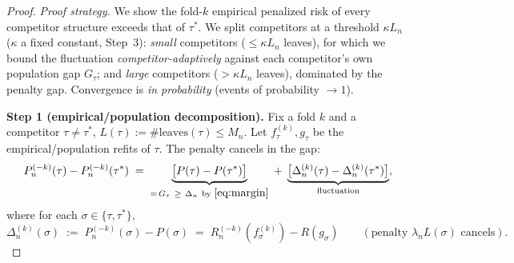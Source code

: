 \begin{proof}
\emph{Proof strategy.} We show the fold-$k$ empirical penalized risk of every
competitor structure exceeds that of $\tau^\ast$. We split competitors at a
threshold $\kappa L_n$ ($\kappa$ a fixed constant, Step~3): \emph{small}
competitors ($\le\kappa L_n$ leaves), for which we bound the fluctuation
\emph{competitor-adaptively} against each competitor's own population gap
$G_\tau$; and \emph{large} competitors ($>\kappa L_n$ leaves), dominated by the
penalty gap. Convergence is \emph{in probability} (events of probability $\to1$).

\smallskip\noindent\textbf{Step 1 (empirical/population decomposition).}
Fix a fold $k$ and a competitor $\tau\neq\tau^\ast$, $L(\tau):=\#\mathrm{leaves}(\tau)
\le M_n$. Let $f_\tau^{(k)},g_\tau$ be the empirical/population refits of $\tau$.
The penalty cancels in the gap:
\begin{equation}\label{eq:gap-decomp}
  P_n^{(-k)}(\tau) - P_n^{(-k)}(\tau^\ast)
  \;=\; \underbrace{\bigl[P(\tau)-P(\tau^\ast)\bigr]}_{=\,G_\tau\ \ge\ \Delta_n\ \text{by }
        \eqref{eq:margin}}
     \;+\; \underbrace{\bigl[\Delta_n^{(k)}(\tau)-\Delta_n^{(k)}(\tau^\ast)\bigr]}_{
        \text{fluctuation}},
\end{equation}
where for each $\sigma\in\{\tau,\tau^\ast\}$,
\begin{equation}\label{eq:fluct-def}
  \Delta_n^{(k)}(\sigma)
  \;:=\; P_n^{(-k)}(\sigma) - P(\sigma)
  \;=\; R_n^{(-k)}(f_\sigma^{(k)}) - R(g_\sigma)
  \qquad(\text{penalty }\lambda_n L(\sigma)\text{ cancels}).
\end{equation}


\end{proof}
